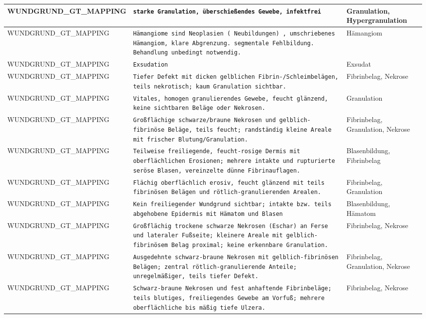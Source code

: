 \begin{longtable}{|p{3.5cm}|p{5cm}|p{6.5cm}|}
WUNDGRUND\_GT\_MAPPING & \texttt{starke Granulation, überschießendes Gewebe, infektfrei} & Granulation, Hypergranulation \\ \hline
WUNDGRUND\_GT\_MAPPING & \texttt{Hämangiome sind Neoplasien ( Neubildungen) , umschriebenes Hämangiom, klare Abgrenzung. segmentale Fehlbildung.
Behandlung unbedingt notwendig.} & Hämangiom \\ \hline
WUNDGRUND\_GT\_MAPPING & \texttt{Exsudation} & Exsudat \\ \hline
WUNDGRUND\_GT\_MAPPING & \texttt{Tiefer Defekt mit dicken gelblichen Fibrin-/Schleimbelägen, teils nekrotisch; kaum Granulation sichtbar.} & Fibrinbelag, Nekrose \\ \hline
WUNDGRUND\_GT\_MAPPING & \texttt{Vitales, homogen granulierendes Gewebe, feucht glänzend, keine sichtbaren Beläge oder Nekrosen.} & Granulation \\ \hline
WUNDGRUND\_GT\_MAPPING & \texttt{Großflächige schwarze/braune Nekrosen und gelblich-fibrinöse Beläge, teils feucht; randständig kleine Areale mit frischer Blutung/Granulation.} & Fibrinbelag, Granulation, Nekrose \\ \hline
WUNDGRUND\_GT\_MAPPING & \texttt{Teilweise freiliegende, feucht-rosige Dermis mit oberflächlichen Erosionen; mehrere intakte und rupturierte seröse Blasen, vereinzelte dünne Fibrinauflagen.} & Blasenbildung, Fibrinbelag \\ \hline
WUNDGRUND\_GT\_MAPPING & \texttt{Flächig oberflächlich erosiv, feucht glänzend mit teils fibrinösen Belägen und rötlich-granulierenden Arealen.} & Fibrinbelag, Granulation \\ \hline
WUNDGRUND\_GT\_MAPPING & \texttt{Kein freiliegender Wundgrund sichtbar; intakte bzw. teils abgehobene Epidermis mit Hämatom und Blasen} & Blasenbildung, Hämatom \\ \hline
WUNDGRUND\_GT\_MAPPING & \texttt{Großflächig trockene schwarze Nekrosen (Eschar) an Ferse und lateraler Fußseite; kleinere Areale mit gelblich-fibrinösem Belag proximal; keine erkennbare Granulation.} & Fibrinbelag, Nekrose \\ \hline
WUNDGRUND\_GT\_MAPPING & \texttt{Ausgedehnte schwarz-braune Nekrosen mit gelblich-fibrinösen Belägen; zentral rötlich-granulierende Anteile; unregelmäßiger, teils tiefer Defekt.} & Fibrinbelag, Granulation, Nekrose \\ \hline
WUNDGRUND\_GT\_MAPPING & \texttt{Schwarz-braune Nekrosen und fest anhaftende Fibrinbeläge; teils blutiges, freiliegendes Gewebe am Vorfuß; mehrere oberflächliche bis mäßig tiefe Ulzera.} & Fibrinbelag, Nekrose \\ \hline

\end{longtable}
